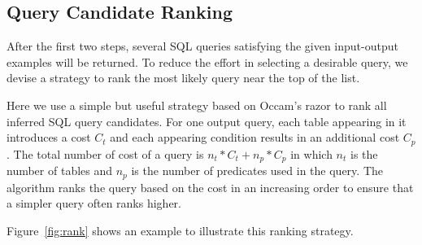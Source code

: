 \subsection{Query Candidate Ranking}
\label{sec:ranking}

After the first two steps, several SQL queries satisfying the given input-output examples
will be returned. To reduce the effort in selecting a desirable query, we devise a strategy
to rank the most likely query near the top of the list.

Here we use a simple but useful strategy based on Occam's razor to rank all inferred SQL query candidates.
For one output query, each table appearing in it introduces a cost $C_t$ and each appearing condition 
results in an additional cost $C_p$. The total number of cost of a query is $n_t*C_t+n_p*C_p$ in which
$n_t$ is the number of tables and $n_p$ is the number of predicates used in the query. The algorithm
ranks the query based on the cost in an increasing order to ensure that a simpler query often ranks higher.

Figure~\ref{fig:rank} shows an example to illustrate this ranking strategy.


